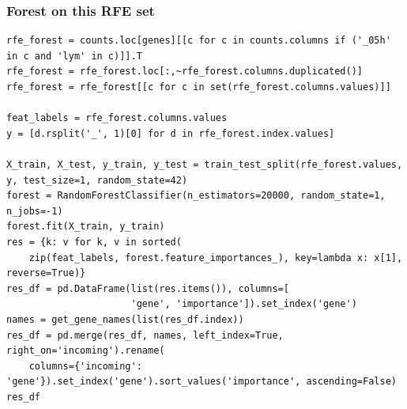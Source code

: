 \documentclass[11pt]{article}
\begin{document}
\subsubsection{Forest on this RFE set}
\label{sec:orgb60c00f}

\begin{verbatim}
rfe_forest = counts.loc[genes][[c for c in counts.columns if ('_05h' in c and 'lym' in c)]].T
rfe_forest = rfe_forest.loc[:,~rfe_forest.columns.duplicated()]
rfe_forest = rfe_forest[[c for c in set(rfe_forest.columns.values)]]

feat_labels = rfe_forest.columns.values
y = [d.rsplit('_', 1)[0] for d in rfe_forest.index.values]

X_train, X_test, y_train, y_test = train_test_split(rfe_forest.values, y, test_size=1, random_state=42)
forest = RandomForestClassifier(n_estimators=20000, random_state=1, n_jobs=-1)
forest.fit(X_train, y_train)
res = {k: v for k, v in sorted(
    zip(feat_labels, forest.feature_importances_), key=lambda x: x[1], reverse=True)}
res_df = pd.DataFrame(list(res.items()), columns=[
                      'gene', 'importance']).set_index('gene')
names = get_gene_names(list(res_df.index))
res_df = pd.merge(res_df, names, left_index=True, right_on='incoming').rename(
    columns={'incoming': 'gene'}).set_index('gene').sort_values('importance', ascending=False)
res_df
\end{verbatim}
\end{document}
